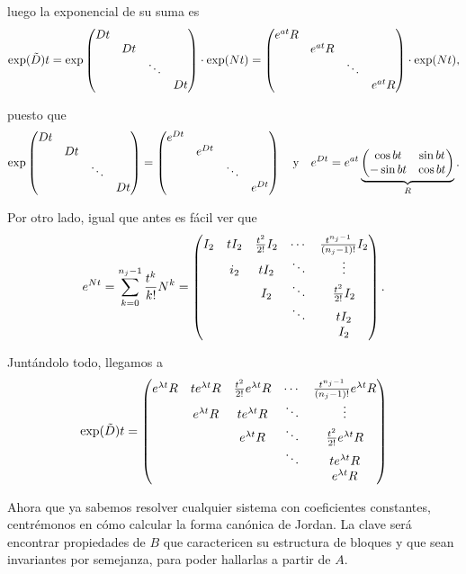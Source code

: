 \documentclass[../ecuaciones_diferenciales.tex]{subfiles}
\begin{document}
luego la exponencial de su suma es
\[\exp(\tilde{D}) t =
	\exp \begin{pmatrix}Dt & & & \\ & Dt & & \\ & & \ddots & \\ & & & Dt\end{pmatrix} \cdot \exp(Nt)
	= \begin{pmatrix}e^{at}R & & & \\ & e^{at}R & & \\ & & \ddots & \\ & & & e^{at}R\end{pmatrix}
	\cdot \exp(Nt),\]

puesto que 
\[\exp\begin{pmatrix}Dt & & & \\ & Dt & & \\ & & \ddots & \\ & & & Dt\end{pmatrix} =
	\begin{pmatrix}e^{Dt} & & & \\ & e^{Dt} & & \\ & & \ddots & \\ & & & e^{Dt}\end{pmatrix}
	\quad \text{y} \quad
	e^{Dt} = e^{at} \underbrace{\begin{pmatrix}\cos bt & \sin bt \\ -\sin bt & \cos
		bt\end{pmatrix}}_{R}.\]

Por otro lado, igual que antes es fácil ver que
\[e^{Nt} = \sum_{k=0}^{n_j-1} \frac{t^k}{k!}N^k =
	\begin{pmatrix}I_2 & tI_2 & \frac{t^2}{2!}I_2 & \cdots & \frac{t^{n_j-1}}{(n_j-1)!}I_2 \\
		& i_2  & tI_2              & \ddots & \vdots                        \\
		&      & I_2               & \ddots & \frac{t^2}{2!}I_2             \\
		&      &                   & \ddots & tI_2                          \\
		&      &                   &        & I_2 \end{pmatrix}.\]

Juntándolo todo, llegamos a
\[\exp(\tilde{D}) t =
	\begin{pmatrix}e^{\lambda t}R & te^{\lambda t}R & \frac{t^2}{2!}e^{\lambda t}R & \cdots & \frac{t^{n_j-1}}{(n_j-1)!}e^{\lambda t}R \\
	& e^{\lambda t}R & te^{\lambda t}R              & \ddots & \vdots                    \\
	&   & e^{\lambda t}R              & \ddots & \frac{t^2}{2!}e^{\lambda t}R            \\
	&   &                & \ddots & te^{\lambda t}R                         \\
	&   &                &        & e^{\lambda t}R \end{pmatrix}
\]

Ahora que ya sabemos resolver cualquier sistema con coeficientes constantes,
centrémonos en cómo calcular la forma canónica de Jordan. La clave será
encontrar propiedades de \(B\) que caractericen su estructura de bloques y que
sean invariantes por semejanza, para poder hallarlas a partir de \(A\).
\end{document}
